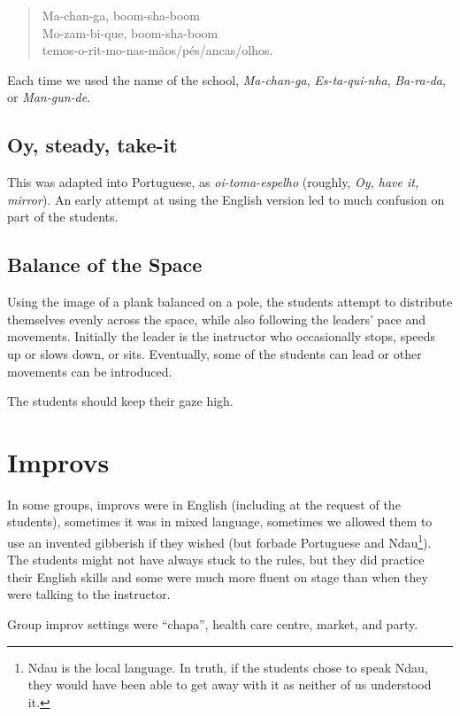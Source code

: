 \documentclass[article,twocolumn,twoside]{memoir}
\begin{document}
\begin{verse}
Ma-chan-ga, boom-sha-boom\\
Mo-zam-bi-que, boom-sha-boom\\
temos-o-rit-mo-nas-mãos/pés/ancas/olhos.
\end{verse}

Each time we used the name of the school, \textit{Ma-chan-ga},
\textit{Es-ta-qui-nha}, \textit{Ba-ra-da}, or \textit{Man-gun-de}.

\subsection{Oy, steady, take-it}
This was adapted into Portuguese, as \textit{oi-toma-espelho} (roughly,
\textit{Oy, have it, mirror}). An early attempt at using the English version
led to much confusion on part of the students.

\subsection{Balance of the Space}
Using the image of a plank balanced on a pole, the students attempt to
distribute themselves evenly across the space, while also following the
leaders' pace and movements. Initially the leader is the instructor who
occasionally stops, speeds up or slows down, or sits. Eventually, some of the
students can lead or other movements can be introduced.

The students should keep their gaze high.

\section{Improvs}

In some groups, improvs were in English (including at the request of the
students), sometimes it was in mixed language, sometimes we allowed them to use
an invented gibberish if they wished (but forbade Portuguese and
Ndau\footnote{Ndau is the local language. In truth, if the students chose to
speak Ndau, they would have been able to get away with it as neither of us
understood it.}). The students might not have always stuck to the rules, but
they did practice their English skills and some were much more fluent on stage
than when they were talking to the instructor.

Group improv settings were ``chapa'', health care centre, market, and party.
\end{document}

